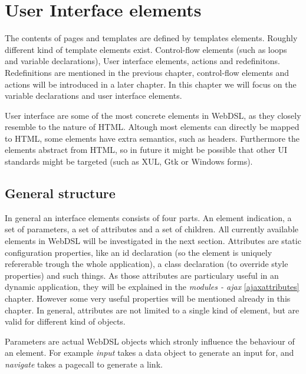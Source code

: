 \chapter{User Interface elements}
The contents of pages and templates are defined by templates elements. Roughly different kind of template elements exist. Control-flow elements (such as loops and variable declarations), User interface elements, actions and redefinitons. Redefinitions are mentioned in the previous chapter, control-flow elements and actions will be introduced in a later chapter. In this chapter we will focus on the variable declarations and user interface elements.

User interface are some of the most concrete elements in WebDSL, as they closely resemble to the nature of HTML. Altough most elements can directly be mapped to HTML, some elements have extra semantics, such as headers. Furthermore the elements abstract from HTML, so in future it might be possible that other UI standards might be targeted (such as XUL, Gtk or Windows forms). 

\section{General structure}
In general an interface elements consists of four parts. An element indication, a set of parameters, a set of attributes and a set of children. All currently available elements in WebDSL will be investigated in the next section. Attributes are static configuration properties, like an id declaration (so the element is uniquely refererable trough the whole application), a class declaration (to override style properties) and such things. As those attributes are particulary useful in an dynamic application, they will be explained in the \emph{modules - ajax} \ref{ajaxattributes} chapter. However some very useful properties will be mentioned already in this chapter. In general, attributes are not limited to a single kind of element, but are valid for different kind of objects.

Parameters are actual WebDSL objects which stronly influence the behaviour of an element. For example \emph{input} takes a data object to generate an input for, and \emph{navigate} takes a pagecall to generate a link. 

